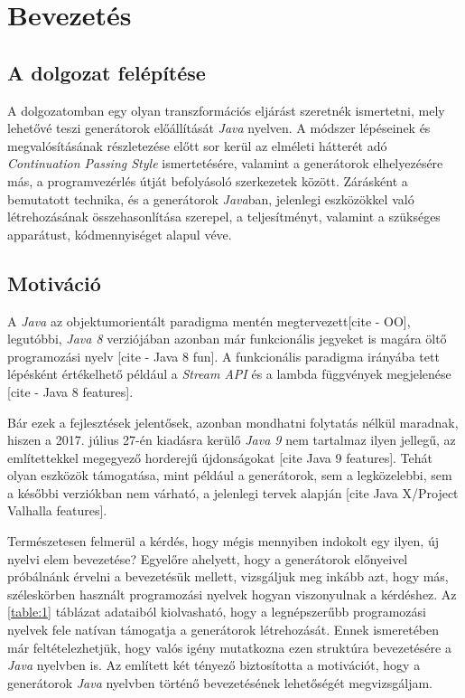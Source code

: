 \chapter{Bevezetés}

\section{A dolgozat felépítése}

A dolgozatomban egy olyan transzformációs eljárást szeretnék ismertetni, mely lehetővé teszi generátorok előállítását \textit{Java} nyelven. A módszer lépéseinek és megvalósításának részletezése előtt sor kerül az elméleti hátterét adó \textit{Continuation Passing Style} ismertetésére, valamint a generátorok elhelyezésére más, a programvezérlés útját befolyásoló szerkezetek között. Zárásként a bemutatott technika, és a generátorok \textit{Java}ban, jelenlegi eszközökkel való létrehozásának összehasonlítása szerepel, a teljesítményt, valamint a szükséges apparátust, kódmennyiséget alapul véve.

\section{Motiváció}

A \textit{Java} az objektumorientált paradigma mentén megtervezett[cite - OO], legutóbbi, \textit{Java 8} verziójában azonban már funkcionális jegyeket is magára öltő programozási nyelv [cite - Java 8 fun]. A funkcionális paradigma irányába tett lépésként értékelhető például a \textit{Stream API} és a lambda függvények megjelenése [cite - Java 8 features]. 

Bár ezek a fejlesztések jelentősek, azonban mondhatni folytatás nélkül maradnak, hiszen a 2017. július 27-én kiadásra kerülő \textit{Java 9} nem tartalmaz ilyen jellegű, az említettekkel megegyező horderejű újdonságokat [cite Java 9 features]. Tehát olyan eszközök támogatása, mint például a generátorok, sem a legközelebbi, sem a későbbi verziókban nem várható, a jelenlegi tervek alapján [cite Java X/Project Valhalla features].

Természetesen felmerül a kérdés, hogy mégis mennyiben indokolt egy ilyen, új nyelvi elem bevezetése? Egyelőre ahelyett, hogy a generátorok előnyeivel próbálnánk érvelni a bevezetésük mellett, vizsgáljuk meg inkább azt, hogy más, széleskörben használt programozási nyelvek hogyan viszonyulnak a kérdéshez. Az \ref{table:1} táblázat adataiból kiolvasható, hogy a legnépszerűbb programozási nyelvek fele natívan támogatja a generátorok létrehozását. Ennek ismeretében már feltételezhetjük, hogy valós igény mutatkozna ezen struktúra bevezetésére a \textit{Java} nyelvben is. Az említett két tényező biztosította a motivációt, hogy a generátorok \textit{Java} nyelvben történő bevezetésének lehetőségét megvizsgáljam.


